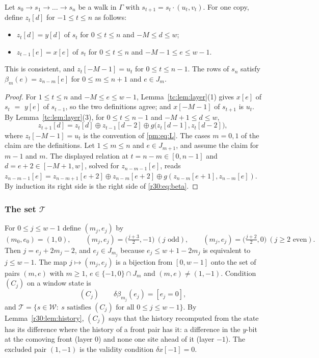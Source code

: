 \begin{lemma}\label{r30:lem:history}
Let $s_0\to s_1\to\dots\to s_n$ be a walk in $\Gamma$ with $s_{t+1}=s_t\cdot(u_t,v_t)$. For one copy, define $z_t[d]$ for $-1\le t\le n$ as follows:
\begin{itemize}
\item $z_t[d]=y[d]$ of $s_t$ for $0\le t\le n$ and $-M\le d\le w$;
\item $z_{t-1}[e]=x[e]$ of $s_t$ for $0\le t\le n$ and $-M-1\le e\le w-1$.
\end{itemize}
This is consistent, and $z_t[-M-1]=u_t$ for $0\le t\le n-1$. The rows of $s_n$ satisfy $\beta_m(e)=z_{n-m}[e]$ for $0\le m\le n+1$ and $e\in J_m$.
\end{lemma}

\begin{proof}
For $1\le t\le n$ and $-M\le e\le w-1$, Lemma~\ref{tc:lem:layer}(1) gives $x[e]$ of $s_t$ $=$ $y[e]$ of $s_{t-1}$, so the two definitions agree; and $x[-M-1]$ of $s_{t+1}$ is $u_t$. By Lemma~\ref{tc:lem:layer}(3), for $0\le t\le n-1$ and $-M+1\le d\le w$,
\[
z_{t+1}[d]=z_t[d]\oplus z_{t-1}[d-2]\oplus g\bigl(z_t[d-1],z_t[d-2]\bigr),
\]
where $z_t[-M-1]=u_t$ is the convention of \eqref{pm:eq:L}. The cases $m=0,1$ of the claim are the definitions. Let $1\le m\le n$ and $e\in J_{m+1}$, and assume the claim for $m-1$ and $m$. The displayed relation at $t=n-m\in[0,n-1]$ and $d=e+2\in[-M+1,w]$, solved for $z_{n-m-1}[e]$, reads $z_{n-m-1}[e]=z_{n-m+1}[e+2]\oplus z_{n-m}[e+2]\oplus g(z_{n-m}[e+1],z_{n-m}[e])$. By induction its right side is the right side of \eqref{r30:eq:beta}.
\end{proof}

\subsubsection*{The set $\mathcal{T}$}
For $0\le j\le w-1$ define $(m_j,e_j)$ by
\[
(m_0,e_0)=(1,0),\qquad (m_j,e_j)=\bigl(\tfrac{j+3}2,-1\bigr)\ (j\text{ odd}),\qquad (m_j,e_j)=\bigl(\tfrac{j+2}2,0\bigr)\ (j\ge2\text{ even}).
\]
Then $j=e_j+2m_j-2$, and $e_j\in J_{m_j}$ because $e_j\le w+1-2m_j$ is equivalent to $j\le w-1$. The map $j\mapsto(m_j,e_j)$ is a bijection from $[0,w-1]$ onto the set of pairs $(m,e)$ with $m\ge1$, $e\in\{-1,0\}\cap J_m$ and $(m,e)\ne(1,-1)$. Condition $(C_j)$ on a window state is
\[
(C_j)\qquad \delta\beta_{m_j}(e_j)=[e_j=0],
\]
and $\mathcal{T}=\{s\in\mathcal{W}:\ s\text{ satisfies }(C_j)\text{ for all }0\le j\le w-1\}$. By Lemma~\ref{r30:lem:history}, $(C_j)$ says that the history recomputed from the state has its difference where the history of a front pair has it: a difference in the $y$-bit at the comoving front (layer $0$) and none one site ahead of it (layer $-1$). The excluded pair $(1,-1)$ is the validity condition $\delta x[-1]=0$.

